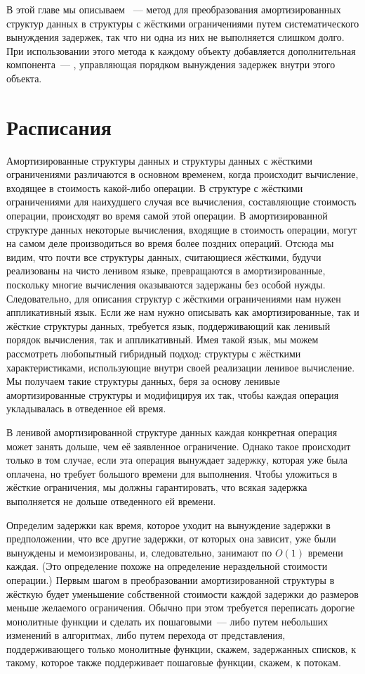 В этой главе мы описываем ~--- метод для
преобразования амортизированных структур данных в структуры с жёсткими
ограничениями путем систематического вынуждения задержек, так что ни
одна из них не выполняется слишком долго. При использовании этого
метода к каждому объекту добавляется дополнительная компонента~---
, управляющая порядком вынуждения задержек
внутри этого объекта.

\section{Расписания}
\label{sc:7.1}

Амортизированные структуры данных и структуры данных с жёсткими
ограничениями различаются в основном временем, когда происходит вычисление,
входящее в стоимость какой-либо операции. В структуре с жёсткими ограничениями для
наихудшего случая все вычисления, составляющие стоимость операции,
происходят во время самой этой операции. В амортизированной структуре
данных некоторые вычисления, входящие в стоимость операции, могут на
самом деле производиться во время более поздних операций. Отсюда мы
видим, что почти все структуры данных, считающиеся жёсткими, будучи
реализованы на чисто ленивом языке, превращаются в амортизированные,
поскольку многие вычисления оказываются задержаны без особой нужды.
Следовательно, для описания структур с жёсткими ограничениями нам
нужен аппликативный язык. Если же нам нужно описывать как
амортизированные, так и жёсткие структуры данных, требуется язык,
поддерживающий как ленивый порядок вычисления, так и
аппликативный. Имея такой язык, мы можем рассмотреть любопытный
гибридный подход: структуры с жёсткими характеристиками, использующие
внутри своей реализации ленивое вычисление. Мы получаем такие
структуры данных, беря за основу ленивые амортизированные структуры и
модифицируя их так, чтобы каждая операция укладывалась в отведенное ей
время.

В ленивой амортизированной структуре данных каждая конкретная операция
может занять дольше, чем её заявленное ограничение. Однако такое
происходит только в том случае, если эта операция вынуждает задержку,
которая уже была оплачена, но требует большого времени для
выполнения. Чтобы уложиться в жёсткие ограничения, мы должны
гарантировать, что всякая задержка выполняется не дольше отведенного
ей времени.

Определим  задержки как
время, которое уходит на вынуждение задержки в предположении, что все
другие задержки, от которых она зависит, уже были вынуждены и
мемоизированы, и, следовательно, занимают по $O(1)$ времени
каждая. (Это определение похоже на определение нераздельной стоимости
операции.) Первым шагом в преобразовании амортизированной структуры в
жёсткую будет уменьшение собственной стоимости каждой
задержки до размеров меньше желаемого ограничения. Обычно при этом
требуется переписать дорогие монолитные функции и сделать их
пошаговыми~--- либо путем небольших изменений в алгоритмах, либо путем
перехода от представления, поддерживающего только монолитные функции,
скажем, задержанных списков, к такому, которое также поддерживает
пошаговые функции, скажем, к потокам.

